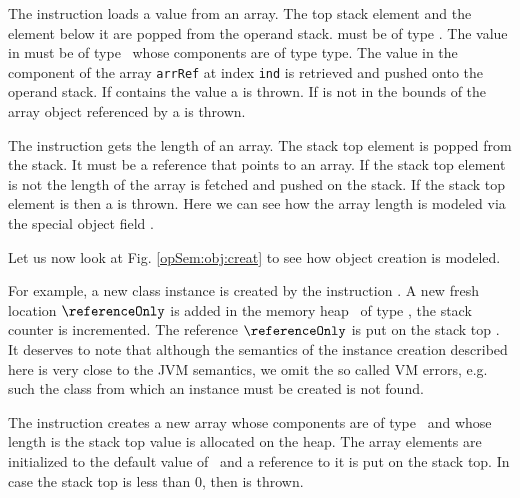 The instruction \arrload{}   loads a value from an array. The top stack element \stackOnlyParam{\counterOnly} and 
the element below it 
  are popped from the operand stack.  \stackOnlyParam{\counterOnly} must be of type \Myint. The value in  must be 
 of type  \ whose components are of type \textrm{type}. The value in the component of the array  \texttt{arrRef} 
 at index \texttt{ind} is retrieved and pushed onto the operand stack.
 If  contains the value \Mynull{} a \NullPointerExc{} is thrown. If \stackOnlyParam{\counterOnly}  is
not in the bounds of the array object referenced by   a \ArrIndexOutOfBoundExc{} is thrown.

The instruction \arraylength{} gets the length of an array.
 The stack top element is popped from the stack. It must be a 
reference that points to an array. If the stack top element \stackOnlyParam{\counterOnly} is not \Mynull{}  the length of the array  
\length{\stackOnlyParam{\counterOnly} } is fetched and pushed on the stack.
If the stack top element \stackOnlyParam{\counterOnly} is \Mynull{} then a \NullPointerExc{} is thrown. Here we can see how the array
 length is modeled via the special object field \length. 


Let us now look at Fig. \ref{opSem:obj:creat} to  see how 
object creation is modeled.

 For example, a new class instance
is created by the instruction \new.  A new fresh location $\referenceOnly$ is added in the memory heap 
\heap \ of type  \clazz, the  stack counter \counterOnly is incremented. The reference $\referenceOnly$ 
is put on the stack  top . It deserves to note that although the semantics of the instance creation
 described here  is very close to the JVM semantics, we omit the so called VM errors, e.g. such the class from which an
 instance must be created is not found.    

The instruction \newarray creates a new array whose components are of type \anyType \ and whose length is the stack top value is allocated on the heap.
The array elements are initialized to the default value of  \anyType \ and a reference to it is put on the stack top. 
In case the stack top is less than 0, then \NegativeArraySizeExc{} is thrown.

